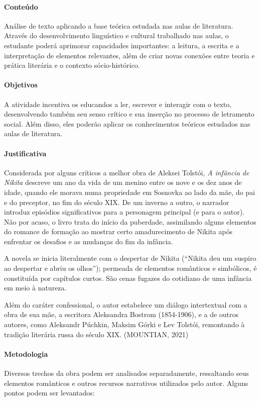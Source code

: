 \documentclass{article}
\begin{document}

\paragraph{Conteúdo}
Análise de texto aplicando a base teórica estudada nas aulas de
literatura. Através do desenvolvimento linguístico e cultural trabalhado
nas aulas, o estudante poderá aprimorar capacidades importantes: a
leitura, a escrita e a interpretação de elementos relevantes, além de
criar novas conexões entre teoria e prática literária e o contexto
sócio-histórico.

\paragraph{Objetivos}
A atividade incentiva os educandos a ler, escrever e interagir com o
texto, desenvolvendo também seu senso crítico e sua inserção no processo
de letramento social. Além disso, eles poderão aplicar os conhecimentos
teóricos estudados nas aulas de literatura.

\paragraph{Justificativa}
Considerada por alguns críticos a melhor obra de Aleksei Tolstói,
\emph{A infância de Nikita} descreve um ano da vida de um menino entre
os nove e os dez anos de idade, quando ele morava numa propriedade em
Sosnovka ao lado da mãe, do pai e do preceptor, no fim do século XIX. De
um inverno a outro, o narrador introduz episódios significativos para a
personagem principal (e para o autor). Não por acaso, o livro trata do
início da puberdade, assimilando alguns elementos do romance de formação
ao mostrar certo amadurecimento de Nikita após enfrentar os desafios e
as mudanças do fim da infância.

A novela se inicia literalmente com o despertar de Nikita (``Nikita deu
um suspiro ao despertar e abriu os olhos''); permeada de elementos
românticos e simbólicos, é constituída por capítulos curtos. São cenas
fugazes do cotidiano de uma infância em meio à natureza.

Além do caráter confessional, o autor estabelece um diálogo intertextual
com a obra de sua mãe, a escritora Aleksandra Bostrom (1854-1906), e a
de outros autores, como Aleksandr Púchkin, Maksim Górki e Lev Tolstói,
remontando à tradição literária russa do século XIX. (MOUNTIAN, 2021)

\paragraph{Metodologia}
Diversos trechos da obra podem ser analisados separadamente, ressaltando
seus elementos românticos e outros recursos narrativos utilizados pelo
autor. Alguns pontos podem ser levantados:
\end{document}
